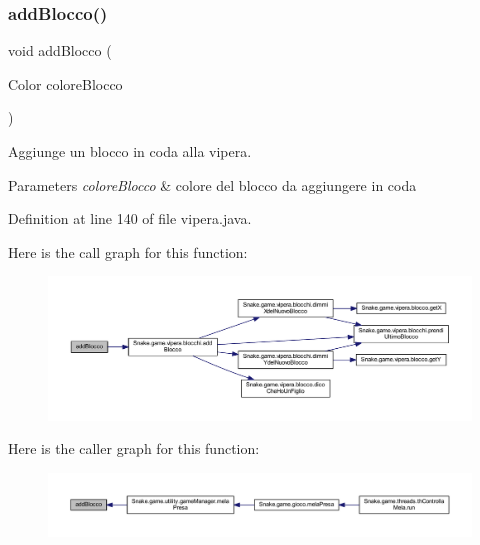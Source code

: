 \subsubsection{\texorpdfstring{add\+Blocco()}{addBlocco()}}
{\footnotesize\ttfamily void add\+Blocco (\begin{DoxyParamCaption}\item[{Color}]{colore\+Blocco }\end{DoxyParamCaption})}



Aggiunge un blocco in coda alla vipera. 


\begin{DoxyParams}{Parameters}
{\em colore\+Blocco} & colore del blocco da aggiungere in coda \\
\hline
\end{DoxyParams}


Definition at line 140 of file vipera.\+java.

Here is the call graph for this function\+:
\nopagebreak
\begin{figure}[H]
\begin{center}
\leavevmode
\includegraphics[width=350pt]{class_snake_1_1game_1_1vipera_1_1vipera_aca08d818f8eb2849ca337ea2c64f344d_cgraph}
\end{center}
\end{figure}
Here is the caller graph for this function\+:
\nopagebreak
\begin{figure}[H]
\begin{center}
\leavevmode
\includegraphics[width=350pt]{class_snake_1_1game_1_1vipera_1_1vipera_aca08d818f8eb2849ca337ea2c64f344d_icgraph}
\end{center}
\end{figure}
\mbox{\label{class_snake_1_1game_1_1vipera_1_1vipera_ac24833a417b3bd7c60e29ed5b7edc29f}} 
